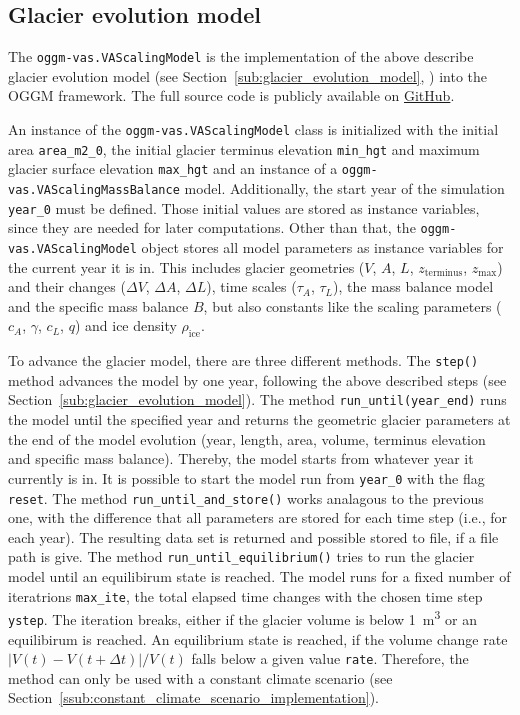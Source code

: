     \subsection{Glacier evolution model} %
    \label{sub:glacier_evolution_model_implementation}

        The \lstinline`oggm-vas.VAScalingModel` is the implementation of the above describe glacier evolution model (see Section~\ref{sub:glacier_evolution_model}, \citet[cf.]{Marzeion2012b}) into the OGGM framework. The full source code is publicly available on \href{https://github.com/OGGM/oggm-vas}{GitHub}.

        An instance of the \lstinline`oggm-vas.VAScalingModel` class is initialized with the initial area \lstinline`area_m2_0`, the initial glacier terminus elevation \lstinline`min_hgt` and maximum glacier surface elevation \lstinline`max_hgt` and an instance of a \lstinline`oggm-vas.VAScalingMassBalance` model. Additionally, the start year of the simulation \lstinline`year_0` must be defined. Those initial values are stored as instance variables, since they are needed for later computations. Other than that, the \lstinline`oggm-vas.VAScalingModel` object stores all model parameters as instance variables for the current year it is in. This includes glacier geometries ($V$, $A$, $L$, $z_\text{terminus}$, $z_\text{max}$) and their changes ($\Delta V$, $\Delta A$, $\Delta L$), time scales ($\tau_A$, $\tau_L$), the mass balance model and the specific mass balance $B$, but also constants like the scaling parameters ($c_A$, $\gamma$, $c_L$, $q$) and ice density $\rho_\text{ice}$.

        To advance the glacier model, there are three different methods. The \lstinline`step()` method advances the model by one year, following the above described steps (see Section~\ref{sub:glacier_evolution_model}). The method \lstinline`run_until(year_end)` runs the model until the specified year and returns the geometric glacier parameters at the end of the model evolution (year, length, area, volume, terminus elevation and specific mass balance). Thereby, the model starts from whatever year it currently is in. It is possible to start the model run from \lstinline`year_0` with the flag \lstinline`reset`. The method \lstinline`run_until_and_store()` works analagous to the previous one, with the difference that all parameters are stored for each time step (i.e., for each year). The resulting data set is returned and possible stored to file, if a file path is give. The method \lstinline`run_until_equilibrium()` tries to run the glacier model until an equilibirum state is reached. The model runs for a fixed number of iteratrions \lstinline`max_ite`, the total elapsed time changes with the chosen time step \lstinline`ystep`. The iteration breaks, either if the glacier volume is below \SI{1}{\cubic\meter} or an equilibirum is reached. An equilibrium state is reached, if the volume change rate $|V(t) - V(t+\Delta t)|/V(t)$ falls below a given value \lstinline`rate`. Therefore, the method can only be used with a constant climate scenario (see Section~\ref{ssub:constant_climate_scenario_implementation}).
    
